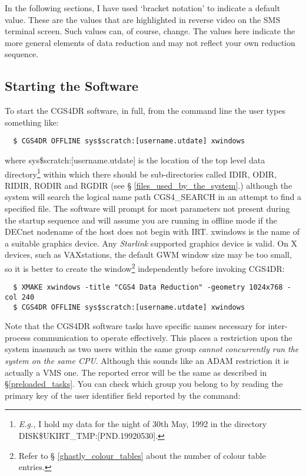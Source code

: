 {In the following sections, I have used `bracket notation' to indicate a 
default value. These are the values that are highlighted in reverse video
on the SMS terminal screen. Such values can, of course, change. The values here
indicate the more general elements of data reduction and may not reflect
your own reduction sequence.

\subsection{Starting the Software}
\label{starting_the_software}

To start the CGS4DR software, in full, from the command line the user types
something like:

\begin{verbatim}
  $ CGS4DR OFFLINE sys$scratch:[username.utdate] xwindows
\end{verbatim}

where {\sc sys\$scratch:[username.utdate]} is the location of the top level 
data directory\footnote{{\em E.g.,} I hold my data for the night of 30th May, 
1992 in the directory DISK\$UKIRT\_TMP:[PND.19920530].} within which there 
should be sub-directories called IDIR, ODIR, RIDIR, RODIR and RGDIR (see \S 
\ref{files_used_by_the_system}.) although the system will search the logical 
name path CGS4\_SEARCH in an attempt to find a specified file. The software 
will prompt for most parameters not present during the startup sequence and 
will assume you are running in {\sf offline} mode if the DECnet nodename of 
the host does not begin with IRT. {\sf xwindows} is the name of a suitable 
graphics device. Any {\sl Starlink} supported graphics device is valid. 
On X devices, such as VAXstations, the default GWM window size may be too 
small, so it is better to create the window\footnote{Refer to \S 
\ref{ghastly_colour_tables} about the number of colour table entries.} 
independently before invoking CGS4DR:

\begin{verbatim}
  $ XMAKE xwindows -title "CGS4 Data Reduction" -geometry 1024x768 -col 240
  $ CGS4DR OFFLINE sys$scratch:[username.utdate] xwindows
\end{verbatim}

Note that the CGS4DR software tasks have specific names necessary for
inter-process communication to operate effectively. This places a restriction
upon the system inasmuch as two users within the same group {\em cannot 
concurrently run the system on the same CPU}. Although this sounds like an 
ADAM restriction it is actually a VMS one. The reported error will be the same 
as described in \S \ref{preloaded_tasks}. You can check which group you belong 
to by reading the primary key of the {\sf user identifier} field 
reported by the command:

}
